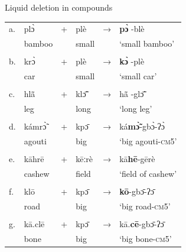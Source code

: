 \documentclass[output=paper]{langscibook}
\begin{document}
 \begin{exe}
     \ex Liquid deletion in compounds \label{ex:traore:liquidDeletionCompounds:28}\\
     \begin{tabularx}{.8\textwidth}{l l l l l l }
       a. & plɔ̀      &      +    &  plè  &  →    &    \textbf{pɔ̀ }-blè \\
        & bamboo  &       {}  & small & {}    & `small bamboo'\\
        &        &           &       &       &               \\
        b. & krɔ̀      &       +   &  plè  &  →    &  \textbf{kɔ̀ }-plè\\
        & car     &       {}  &   small   &   &   `small car'\\
        &         &           &       &       &               \\
        c. & hlã̄     &   +       &  klɔ̃̄  &  →    & hã̄ -glɔ̃̄ \\
        & leg     & {}        & long      & {}    & `long leg'\\
        &        &           &       &       &               \\
        d. & kámrɔ̃̀ &  +    & kpɔ̄       &  →    &  ká\textbf{mɔ̃̀}{}-gbɔ̀-ʔɔ̀\\
        & agouti      &       & big       &       &   `big agouti-\textsc{cm}5'\\
        &         &           &       &       &               \\
        e. & kāhrē   &   +      &    kēːrè   &   →   & kā\textbf{hē}{}-gērè \\
        & cashew  &           &  field    &       & `field of cashew'\\
        &        &           &       &       &               \\
       f. & klō      &   +       &   kpɔ̄     &   →  & \textbf{kō}{}-gbɔ̄-ʔɔ̄  \\ 
        & road    &           & big       &       & `big road-\textsc{cm}5'\\
         &       &           &       &       &               \\
        g. & kā.clē  &   +       &   kpɔ̄      &   →  & kā.\textbf{cē}{}-gbɔ̄-ʔɔ̄  \\
        & bone    &           &   big     &       & `big bone-\textsc{cm}5'\\
     \end{tabularx}
 \end{exe}
\end{document}
